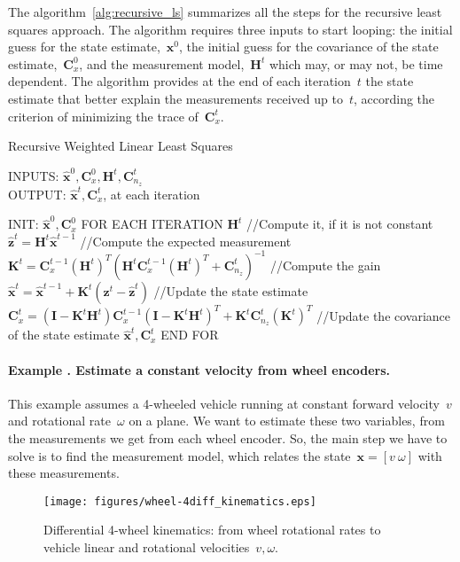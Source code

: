 The algorithm~\ref{alg:recursive_ls} summarizes all the steps for the recursive least squares approach. The algorithm requires three inputs to start looping: the initial guess for the state estimate,~$\mathbf{x}^0$, the initial guess for the covariance of the state estimate,~$\mathbf{C}^0_x$, and the measurement model,~$\mathbf{H}^t$ which may, or may not, be time dependent. The algorithm provides at the end of each iteration~$t$ the state estimate that better explain the measurements received up to~$t$, according the criterion of minimizing the trace of~$\mathbf{C}^t_x$.
\begin{algorithm}
\caption{Recursive Weighted Linear Least Squares}
INPUTS: $\hat{\mathbf{x}}^0,\mathbf{C}^0_x,\mathbf{H}^t,\mathbf{C}^t_{n_z}$\\
OUTPUT: $\hat{\mathbf{x}}^t,\mathbf{C}^t_x$, at each iteration
\begin{algorithmic}
\STATE INIT: $\hat{\mathbf{x}}^0,\mathbf{C}^0_x$
\STATE FOR EACH ITERATION
\STATE \hspace{1cm} $\mathbf{H}^t$ //Compute it, if it is not constant
\STATE \hspace{1cm} $\hat{\mathbf{z}}^t = \mathbf{H}^t\hat{\mathbf{x}}^{t-1}$ //Compute the expected measurement 
\STATE \hspace{1cm} $\mathbf{K}^t = \mathbf{C}^{t-1}_x(\mathbf{H}^t)^T(\mathbf{H}^t\mathbf{C}^{t-1}_x(\mathbf{H}^t)^T+\mathbf{C}^t_{n_z})^{-1}$ 
//Compute the gain
\STATE \hspace{1cm} $\hat{\mathbf{x}}^t = \hat{\mathbf{x}}^{t-1} + \mathbf{K}^t(\mathbf{z}^t - \hat{\mathbf{z}}^t)$ //Update the state estimate
\STATE \hspace{1cm} $\mathbf{C}^t_{x} = (\mathbf{I}-\mathbf{K}^t\mathbf{H}^t)\mathbf{C}^{t-1}_x(\mathbf{I}-\mathbf{K}^t\mathbf{H}^t)^T
		    + \mathbf{K}^t\mathbf{C}^t_{n_z}(\mathbf{K}^t)^T$ //Update the covariance of the state estimate
\RETURN $\hat{\mathbf{x}}^t,\mathbf{C}^t_x$		    
\STATE END FOR
\end{algorithmic}
\label{alg:recursive_ls}
\end{algorithm}

\paragraph{Example \theexamplecounter. Estimate a constant velocity from wheel encoders.}
This example assumes a 4-wheeled vehicle running at constant forward velocity~$v$ and rotational rate~$\omega$ on a plane.
We want to estimate these two variables, from the measurements we get from each wheel encoder. So, the main step we have to solve is to find the measurement model, which relates the state~$\mathbf{x}=[v\ \omega]$ with these measurements.
\begin{figure}[h!]
  \texttt{[image: figures/wheel-4diff\_kinematics.eps]}
  \caption{Differential 4-wheel kinematics: from wheel rotational rates to vehicle linear and rotational velocities~$v,\omega$.}
  \label{fig:wheel-4diff_kinematics}
\end{figure}

